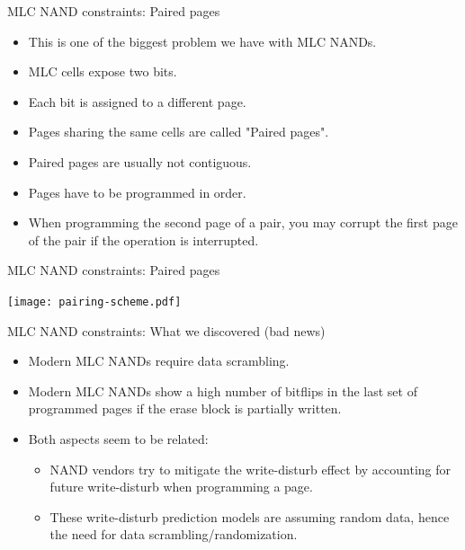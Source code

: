 \documentclass[aspectratio=169,obeyspaces,spaces,hyphens,dvipsnames]{beamer}
\begin{document}
\begin{frame}{MLC NAND constraints: Paired pages}
  \begin{itemize}
  \item This is one of the biggest problem we have with MLC NANDs.
  \item MLC cells expose two bits.
  \item Each bit is assigned to a different page.
  \item Pages sharing the same cells are called "Paired pages".
  \item Paired pages are usually not contiguous.
  \item Pages have to be programmed in order.
  \item When programming the second page of a pair, you may corrupt
	the first page of the pair if the operation is interrupted.
  \end{itemize}
\end{frame}

\begin{frame}{MLC NAND constraints: Paired pages}
  \begin{center}
    \texttt{[image: pairing-scheme.pdf]}
  \end{center}
\end{frame}

\begin{frame}{MLC NAND constraints: What we discovered (bad news)}
  \begin{itemize}
  \item Modern MLC NANDs require data scrambling.
  \item Modern MLC NANDs show a high number of bitflips in the last
	set of programmed pages if the erase block is partially
	written.
  \item Both aspects seem to be related:
    \begin{itemize}
    \item NAND vendors try to mitigate the write-disturb effect by
	  accounting for future write-disturb when programming a page.
    \item These write-disturb prediction models are assuming random
	  data, hence the need for data scrambling/randomization.
    \end{itemize}
  \end{itemize}
\end{frame}
\end{document}
